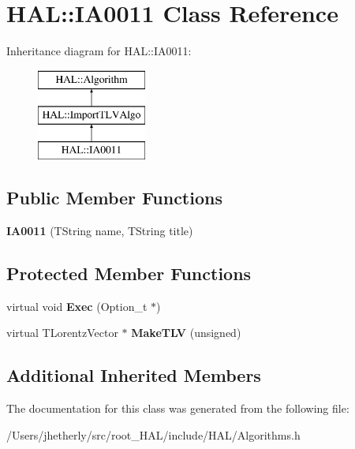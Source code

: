 \hypertarget{class_h_a_l_1_1_i_a0011}{\section{H\-A\-L\-:\-:I\-A0011 Class Reference}
\label{class_h_a_l_1_1_i_a0011}
}
Inheritance diagram for H\-A\-L\-:\-:I\-A0011\-:\begin{figure}[H]
\begin{center}
\leavevmode
\includegraphics[height=3.000000cm]{class_h_a_l_1_1_i_a0011}
\end{center}
\end{figure}
\subsection*{Public Member Functions}
\begin{DoxyCompactItemize}
\item 
\hypertarget{class_h_a_l_1_1_i_a0011_a97e917fb60b60941fcb9cbea062ef4f3}{{\bfseries I\-A0011} (T\-String name, T\-String title)}\label{class_h_a_l_1_1_i_a0011_a97e917fb60b60941fcb9cbea062ef4f3}

\end{DoxyCompactItemize}
\subsection*{Protected Member Functions}
\begin{DoxyCompactItemize}
\item 
\hypertarget{class_h_a_l_1_1_i_a0011_a1e098f2695b7ec272206c86366154460}{virtual void {\bfseries Exec} (Option\-\_\-t $\ast$)}\label{class_h_a_l_1_1_i_a0011_a1e098f2695b7ec272206c86366154460}

\item 
\hypertarget{class_h_a_l_1_1_i_a0011_a01ad5ada48b556d3b10e648f6b9687a6}{virtual T\-Lorentz\-Vector $\ast$ {\bfseries Make\-T\-L\-V} (unsigned)}\label{class_h_a_l_1_1_i_a0011_a01ad5ada48b556d3b10e648f6b9687a6}

\end{DoxyCompactItemize}
\subsection*{Additional Inherited Members}


The documentation for this class was generated from the following file\-:\begin{DoxyCompactItemize}
\item 
/\-Users/jhetherly/src/root\-\_\-\-H\-A\-L/include/\-H\-A\-L/Algorithms.\-h\end{DoxyCompactItemize}
